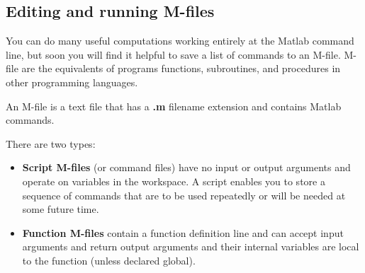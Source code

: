 \subsection{Editing and running M-files} You can do many useful computations
working entirely at the Matlab command line, but soon you will find it helpful
to save a list of commands to an M-file.  M-file are the equivalents of programs
functions, subroutines, and procedures in other programming languages.

An M-file is a text file that has a \textbf{.m} filename extension and contains 
Matlab commands.

There are two types:
\begin{itemize}
  \item{\textbf{Script M-files}} (or command files) have no input or output
  arguments and operate on variables in the workspace.  A script enables you to
  store a sequence of commands that are to be used repeatedly or will be needed
  at some future time.
  
  \item{\textbf{Function M-files}} contain a function definition line and can
  accept input arguments and return output arguments and their internal
  variables are local to the function (unless declared global).
\end{itemize}

